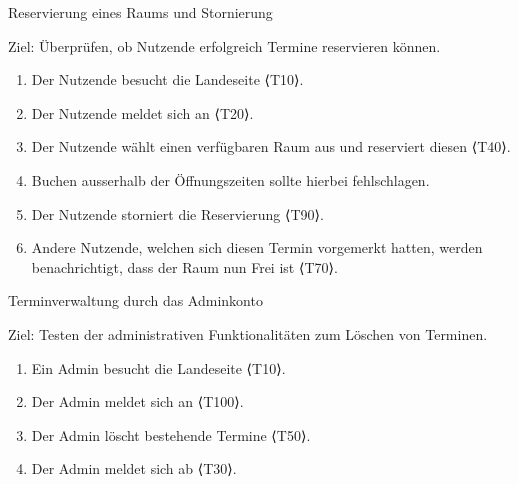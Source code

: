 \begin{scenario}{20}{Reservierung eines Raums und Stornierung}
  \item[Ziel:] Überprüfen, ob Nutzende erfolgreich Termine reservieren können.
  \begin{enumerate}
    \item Der Nutzende besucht die Landeseite ⟨T10⟩.
    \item Der Nutzende meldet sich an ⟨T20⟩.
    \item Der Nutzende wählt einen verfügbaren Raum aus und reserviert diesen ⟨T40⟩.
    \item Buchen ausserhalb der Öffnungszeiten sollte hierbei fehlschlagen.
    \item Der Nutzende storniert die Reservierung ⟨T90⟩.
    \item Andere Nutzende, welchen sich diesen Termin vorgemerkt hatten, werden benachrichtigt, dass der Raum nun Frei ist ⟨T70⟩.
  \end{enumerate}
\end{scenario}

\begin{scenario}{30}{Terminverwaltung durch das Adminkonto}
  \item[Ziel:] Testen der administrativen Funktionalitäten zum Löschen von Terminen.
  \begin{enumerate}
    \item Ein Admin besucht die Landeseite ⟨T10⟩.
    \item Der Admin meldet sich an ⟨T100⟩.
    \item Der Admin löscht bestehende Termine ⟨T50⟩.
    \item Der Admin meldet sich ab ⟨T30⟩.
  \end{enumerate}
\end{scenario}

\pagebreak

